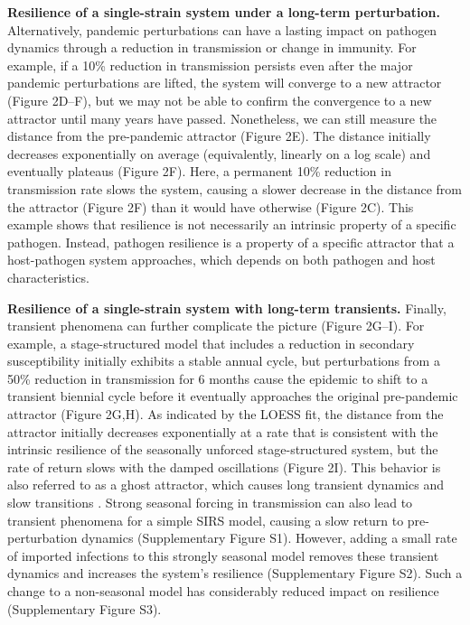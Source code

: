 \documentclass[12pt]{article}
\begin{document}
\textbf{Resilience of a single-strain system under a long-term perturbation.} 
Alternatively, pandemic perturbations can have a lasting impact on pathogen dynamics through a reduction in transmission or change in immunity.
For example, if a 10\% reduction in transmission persists even after the major pandemic perturbations are lifted, the system will converge to a new attractor (Figure 2D--F), but we may not be able to confirm the convergence to a new attractor until many years have passed.
Nonetheless, we can still measure the distance from the pre-pandemic attractor (Figure 2E).
The distance initially decreases exponentially on average (equivalently, linearly on a log scale) and eventually plateaus (Figure 2F).
Here, a permanent 10\% reduction in transmission rate slows the system, causing a slower decrease in the distance from the attractor (Figure 2F) than it would have otherwise (Figure 2C).
This example shows that resilience is not necessarily an intrinsic property of a specific pathogen.
Instead, pathogen resilience is a property of a specific attractor that a host-pathogen system approaches, which depends on both pathogen and host characteristics.

\textbf{Resilience of a single-strain system with long-term transients.} 
Finally, transient phenomena can further complicate the picture (Figure 2G--I).
For example, a stage-structured model that includes a reduction in secondary susceptibility initially exhibits a stable annual cycle, but perturbations from a 50\% reduction in transmission for 6 months cause the epidemic to shift to a transient biennial cycle before it eventually approaches the original pre-pandemic attractor (Figure 2G,H).
As indicated by the LOESS fit, the distance from the attractor initially decreases exponentially at a rate that is consistent with the intrinsic resilience of the seasonally unforced stage-structured system, but the rate of return slows with the damped oscillations (Figure 2I).
This behavior is also referred to as a ghost attractor, which causes long transient dynamics and slow transitions \citep{hastings2018transient}.
Strong seasonal forcing in transmission can also lead to transient phenomena for a simple SIRS model, causing a slow return to pre-perturbation dynamics (Supplementary Figure S1).
However, adding a small rate of imported infections to this strongly seasonal model removes these transient dynamics and increases the system's resilience (Supplementary Figure S2).
Such a change to a non-seasonal model has considerably reduced impact on resilience (Supplementary Figure S3).
\end{document}
